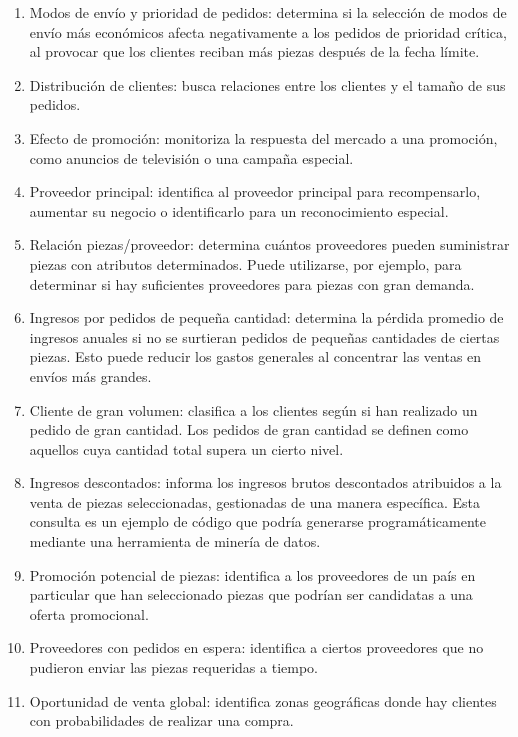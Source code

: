 \documentclass[12pt, letter paper]{report}
\begin{document}
\begin{enumerate}
        más importante del stock de los proveedores en un país determinado.
        \item Modos de envío y prioridad de pedidos: determina si la
        selección de modos de envío más económicos afecta negativamente a
        los pedidos de prioridad crítica, al provocar que los clientes
        reciban más piezas después de la fecha límite.
        \item Distribución de clientes: busca relaciones entre los clientes
        y el tamaño de sus pedidos.
        \item Efecto de promoción: monitoriza la respuesta del mercado a una
        promoción, como anuncios de televisión o una campaña especial.
        \item Proveedor principal: identifica al proveedor principal para
        recompensarlo, aumentar su negocio o identificarlo para un
        reconocimiento especial.
        \item Relación piezas/proveedor: determina cuántos proveedores
        pueden suministrar piezas con atributos determinados. Puede
        utilizarse, por ejemplo, para determinar si hay suficientes
        proveedores para piezas con gran demanda.
        \item Ingresos por pedidos de pequeña cantidad: determina la pérdida
        promedio de ingresos anuales si no se surtieran pedidos de pequeñas
        cantidades de ciertas piezas. Esto puede reducir los gastos
        generales al concentrar las ventas en envíos más grandes.
        \item Cliente de gran volumen: clasifica a los clientes según si han
        realizado un pedido de gran cantidad. Los pedidos de gran cantidad
        se definen como aquellos cuya cantidad total supera un cierto nivel.
        \item Ingresos descontados: informa los ingresos brutos descontados
        atribuidos a la venta de piezas seleccionadas, gestionadas de una
        manera específica. Esta consulta es un ejemplo de código que podría
        generarse programáticamente mediante una herramienta de minería de
        datos.
        \item Promoción potencial de piezas: identifica a los proveedores de
        un país en particular que han seleccionado piezas que podrían ser
        candidatas a una oferta promocional.
        \item Proveedores con pedidos en espera: identifica a ciertos
        proveedores que no pudieron enviar las piezas requeridas a tiempo.
        \item Oportunidad de venta global: identifica zonas geográficas
        donde hay clientes con probabilidades de realizar una compra.
      \end{enumerate}
\end{document}
